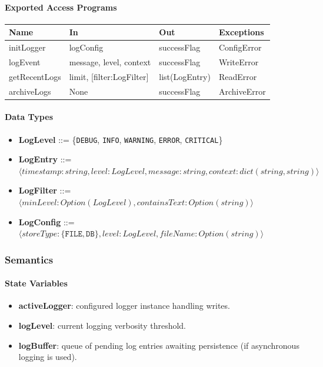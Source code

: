 \documentclass[12pt, titlepage]{article}
\begin{document}
\paragraph{Exported Access Programs}
\begin{center}
\renewcommand{\arraystretch}{1.2}
\begin{tabularx}{\textwidth}{l X X l}
\toprule
\textbf{Name} & \textbf{In} & \textbf{Out} & \textbf{Exceptions}\\
\midrule
initLogger & logConfig & successFlag & ConfigError \\
logEvent & message, level, context & successFlag & WriteError \\
getRecentLogs & limit, [filter:LogFilter] & list(LogEntry) & ReadError \\
archiveLogs & None & successFlag & ArchiveError \\
\bottomrule
\end{tabularx}
\end{center}

\paragraph{Data Types}
\begin{itemize}
  \item \textbf{LogLevel} ::= \{\texttt{DEBUG}, \texttt{INFO}, \texttt{WARNING}, \texttt{ERROR}, \texttt{CRITICAL}\}
  \item \textbf{LogEntry} ::= $\langle timestamp:string, level:LogLevel, message:string, context:dict(string,string) \rangle$
  \item \textbf{LogFilter} ::= $\langle minLevel:Option(LogLevel), containsText:Option(string) \rangle$
  \item \textbf{LogConfig} ::= $\langle storeType:\{\texttt{FILE},\texttt{DB}\}, level:LogLevel, fileName:Option(string) \rangle$
\end{itemize}

\subsubsection{Semantics}

\paragraph{State Variables}
\begin{itemize}
  \item \textbf{activeLogger}: configured logger instance handling writes.
  \item \textbf{logLevel}: current logging verbosity threshold.
  \item \textbf{logBuffer}: queue of pending log entries awaiting persistence (if asynchronous logging is used).
\end{itemize}
\end{document}
